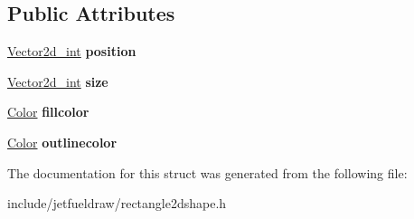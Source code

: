 \subsection*{Public Attributes}
\begin{DoxyCompactItemize}
\item 
\mbox{\label{structjetfuel_1_1draw_1_1Rectangle__2d__shape_1_1Rectangle__2d__shape__characteristics_afc9362283c71182811e3ed1b4a3b14ee}} 
\hyperlink{classjetfuel_1_1draw_1_1Vector2d}{Vector2d\+\_\+int} {\bfseries position}
\item 
\mbox{\label{structjetfuel_1_1draw_1_1Rectangle__2d__shape_1_1Rectangle__2d__shape__characteristics_acddc8d54e69ac0583384aad76062d342}} 
\hyperlink{classjetfuel_1_1draw_1_1Vector2d}{Vector2d\+\_\+int} {\bfseries size}
\item 
\mbox{\label{structjetfuel_1_1draw_1_1Rectangle__2d__shape_1_1Rectangle__2d__shape__characteristics_a5774c2d3c7f2a470f2e0a4952e9ff8a8}} 
\hyperlink{classjetfuel_1_1draw_1_1Color}{Color} {\bfseries fillcolor}
\item 
\mbox{\label{structjetfuel_1_1draw_1_1Rectangle__2d__shape_1_1Rectangle__2d__shape__characteristics_adb7f45cc00b5e1f96c248b4d6fa592f4}} 
\hyperlink{classjetfuel_1_1draw_1_1Color}{Color} {\bfseries outlinecolor}
\end{DoxyCompactItemize}


The documentation for this struct was generated from the following file\+:\begin{DoxyCompactItemize}
\item 
include/jetfueldraw/rectangle2dshape.\+h\end{DoxyCompactItemize}
